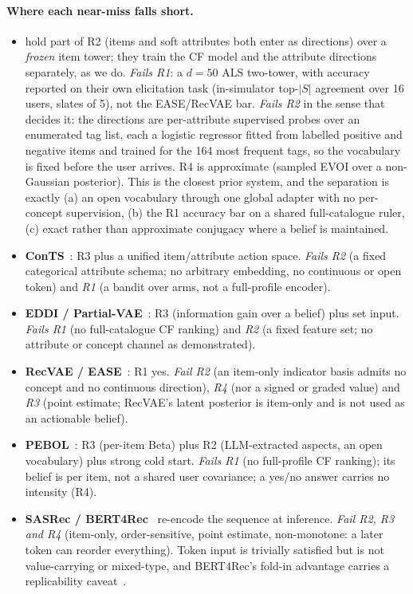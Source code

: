 \documentclass[manuscript,screen]{acmart}
\begin{document}
\paragraph{Where each near-miss falls short.}
\begin{itemize}[leftmargin=1.4em,itemsep=2pt]
  \item \textbf{\citet{biyik2023soft}} hold part of R2 (items and soft attributes both enter as directions) over a \emph{frozen} item tower; they train the CF model and the attribute directions separately, as we do. \emph{Fails R1}: a $d{=}50$ ALS two-tower, with accuracy reported on their own elicitation task (in-simulator top-$|S|$ agreement over 16 users, slates of 5), not the EASE/RecVAE bar. \emph{Fails R2} in the sense that decides it: the directions are per-attribute supervised probes over an enumerated tag list, each a logistic regressor fitted from labelled positive and negative items and trained for the 164 most frequent tags, so the vocabulary is fixed before the user arrives. R4 is approximate (sampled EVOI over a non-Gaussian posterior). This is the closest prior system, and the separation is exactly (a) an open vocabulary through one global adapter with no per-concept supervision, (b) the R1 accuracy bar on a shared full-catalogue ruler, (c) exact rather than approximate conjugacy where a belief is maintained.
  \item \textbf{ConTS}~\citep{li2021seamlessly}: R3 plus a unified item/attribute action space. \emph{Fails R2} (a fixed categorical attribute schema; no arbitrary embedding, no continuous or open token) and \emph{R1} (a bandit over arms, not a full-profile encoder).
  \item \textbf{EDDI / Partial-VAE}~\citep{ma2019eddi}: R3 (information gain over a belief) plus set input. \emph{Fails R1} (no full-catalogue CF ranking) and \emph{R2} (a fixed feature set; no attribute or concept channel as demonstrated).
  \item \textbf{RecVAE / EASE}~\citep{ren2020recvae,steck2019ease}: R1 yes. \emph{Fail R2} (an item-only indicator basis admits no concept and no continuous direction), \emph{R4} (nor a signed or graded value) and \emph{R3} (point estimate; RecVAE's latent posterior is item-only and is not used as an actionable belief).
  \item \textbf{PEBOL}~\citep{austin2024bayesian}: R3 (per-item Beta) plus R2 (LLM-extracted aspects, an open vocabulary) plus strong cold start. \emph{Fails R1} (no full-profile CF ranking); its belief is per item, not a shared user covariance; a yes/no answer carries no intensity (R4).
  \item \textbf{SASRec / BERT4Rec}~\citep{kang2018sasrec,sun2019bert4rec} re-encode the sequence at inference. \emph{Fail R2, R3 and R4} (item-only, order-sensitive, point estimate, non-monotone: a later token can reorder everything). Token input is trivially satisfied but is not value-carrying or mixed-type, and BERT4Rec's fold-in advantage carries a replicability caveat~\citep{petrov2022replicability}.
\end{itemize}
\end{document}
